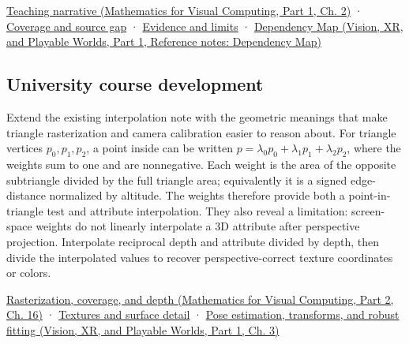 \href{../02-Mathematics-for-Visual-Computing-P01/main.pdf\#nameddest=01-foundations-i-ch018-the-sensor-needs-coordinates-inside-the-triangle}{Teaching narrative (Mathematics for Visual Computing, Part 1, Ch. 2)} · \hyperref[appendix-fd090d982a15-phase-6---parts-501-600]{Coverage and source gap} · \hyperref[appendix-a103e7846d21-phase-6---source-analysis-and-verification]{Evidence and limits} · \href{../07-Vision-XR-and-Playable-Worlds-P01/main.pdf\#nameddest=appendix-4ad47bdd269a}{Dependency Map (Vision, XR, and Playable Worlds, Part 1, Reference notes: Dependency Map)}

\subsection{University course development}\label{appendix-02b9d9a81dca-university-course-development}

\hypertarget{appendix-02b9d9a81dca-university-course-development}{}

Extend the existing interpolation note with the geometric meanings that make triangle rasterization and camera calibration easier to reason about. For triangle vertices \(p_0,p_1,p_2\), a point inside can be written \(p=\lambda_0p_0+\lambda_1p_1+\lambda_2p_2\), where the weights sum to one and are nonnegative. Each weight is the area of the opposite subtriangle divided by the full triangle area; equivalently it is a signed edge-distance normalized by altitude. The weights therefore provide both a point-in-triangle test and attribute interpolation. They also reveal a limitation: screen-space weights do not linearly interpolate a 3D attribute after perspective projection. Interpolate reciprocal depth and attribute divided by depth, then divide the interpolated values to recover perspective-correct texture coordinates or colors.

\href{../02-Mathematics-for-Visual-Computing-P02/main.pdf\#nameddest=03-visual-computing-i-ch012-rasterization-coverage-and-depth}{Rasterization, coverage, and depth (Mathematics for Visual Computing, Part 2, Ch. 16)} · \hyperref[03-visual-computing-i-ch019-textures-and-surface-detail]{Textures and surface detail} · \href{../07-Vision-XR-and-Playable-Worlds-P01/main.pdf\#nameddest=04-visual-computing-ii-ch032-pose-estimation-transforms-and-robust-fitting}{Pose estimation, transforms, and robust fitting (Vision, XR, and Playable Worlds, Part 1, Ch. 3)}
